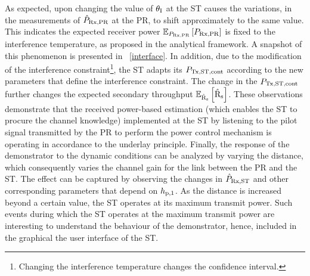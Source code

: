 As expected, upon changing the value of $\theta_{\text{I}}$ at the ST causes the variations, in the measurements of $\hat{P}_{\text{Rx,PR}}$ at the PR, to shift approximately to the same value. This indicates the expected receiver power ${\mathbb E}_{P_{\text{Rx,PR}}}\left[ P_{\text{Rx,PR}} \right]$ is fixed to the interference temperature, as proposed in the analytical framework. A snapshot of this phenomenon is presented in \figurename~\ref{interface}. In addition, due to the modification of the interference constraint\footnote{Changing the interference temperature changes the confidence interval.}, the ST adapts its $P_{\text{Tx,ST,cont}}$ according to the new parameters that define the interference constraint. The change in the $P_{\text{Tx,ST,cont}}$ further changes the expected secondary throughput ${\mathbb E}_{\hat{\text{{R}}}_{\text{s}}}\left[ \hat{\text{{R}}}_{\text{s}} \right]$. These observations demonstrate that the received power-based estimation (which enables the ST to procure the channel knowledge) implemented at the ST by listening to the pilot signal transmitted by the PR to perform the power control mechanism is operating in accordance to the underlay principle. Finally, the response of the demonstrator to the dynamic conditions can be analyzed by varying the distance, which consequently varies the channel gain for the link between the PR and the ST. The effect can be captured by observing the changes in $\hat{P}_{\text{Rx,ST}}$ and other corresponding parameters that depend on $h_{\text{p,1}}$. As the distance is increased beyond a certain value, the ST operates at its maximum transmit power. Such events during which the ST operates at the maximum transmit power are interesting to understand the behaviour of the demonstrator, hence, included in the graphical the user interface of the ST.

